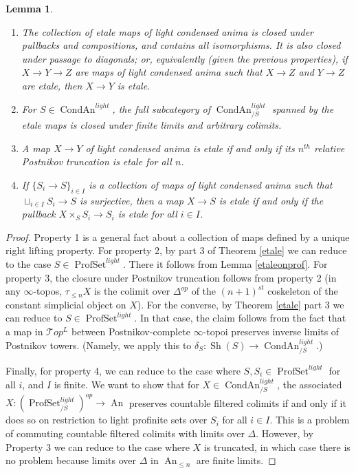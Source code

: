 \documentclass[12pt]{article}
\newtheorem{lemma}[theorem]{Lemma}
\newcommand{\on}{\operatorname}
\begin{document}
\begin{lemma}\label{etaleproperties}
\begin{enumerate}
\item The collection of etale maps of light condensed anima is closed under pullbacks and compositions, and contains all isomorphisms.  It is also closed under passage to diagonals; or, equivalently (given the previous properties), if $X\rightarrow Y\rightarrow Z$ are maps of light condensed anima such that $X\rightarrow Z$ and $Y\rightarrow Z$ are etale, then $X\rightarrow Y$ is etale.
\item For $S\in\on{CondAn}^{light}$, the full subcategory of $\on{CondAn}^{light}_{/S}$ spanned by the etale maps is closed under finite limits and arbitrary colimits.
\item A map $X\rightarrow Y$ of light condensed anima is etale if and only if its $n^{th}$ relative Postnikov truncation is etale for all $n$.
\item If $\{S_i\rightarrow S\}_{i\in I}$ is a collection of maps of light condensed anima such that $\sqcup_{i\in I} S_i\rightarrow S$ is surjective, then a map $X\rightarrow S$ is etale if and only if the pullback $X\times_S S_i\rightarrow S_i$ is etale for all $i\in I$.
\end{enumerate}
\end{lemma}
\begin{proof}
Property 1 is a general fact about a collection of maps defined by a unique right lifting property.  For property 2, by part 3 of Theorem \ref{etale} we can reduce to the case $S\in\on{ProfSet}^{light}$.  There it follows from Lemma \ref{etaleonprof}.  For property 3, the closure under Postnikov truncation follows from property 2 (in any $\infty$-topos, $\tau_{\leq n}X$ is the colimit over $\Delta^{op}$ of the $(n+1)^{st}$ coskeleton of the constant simplicial object on $X$).  For the converse, by Theorem \ref{etale} part 3 we can reduce to $S\in\on{ProfSet}^{light}$.  In that case, the claim follows from the fact that a map in $\mathcal{T}op^L$ between Postnikov-complete $\infty$-topoi preserves inverse limits of Postnikov towers. (Namely, we apply this to $\delta_S:\on{Sh}(S)\rightarrow\on{CondAn}^{light}_{/S}$.)

Finally, for property 4, we can reduce to the case where $S,S_i\in\on{ProfSet}^{light}$ for all $i$, and $I$ is finite.  We want to show that for $X\in\on{CondAn}^{light}_{/S}$, the associated $X:(\on{ProfSet}^{light}_{/S})^{op}\rightarrow \on{An}$ preserves countable filtered colimits if and only if it does so on restriction to light profinite sets over $S_i$ for all $i\in I$.  This is a problem of commuting countable filtered colimits with limits over $\Delta$.  However, by Property 3 we can reduce to the case where $X$ is truncated, in which case there is no problem because limits over $\Delta$ in $\on{An}_{\leq n}$ are finite limits.
\end{proof}
\end{document}

